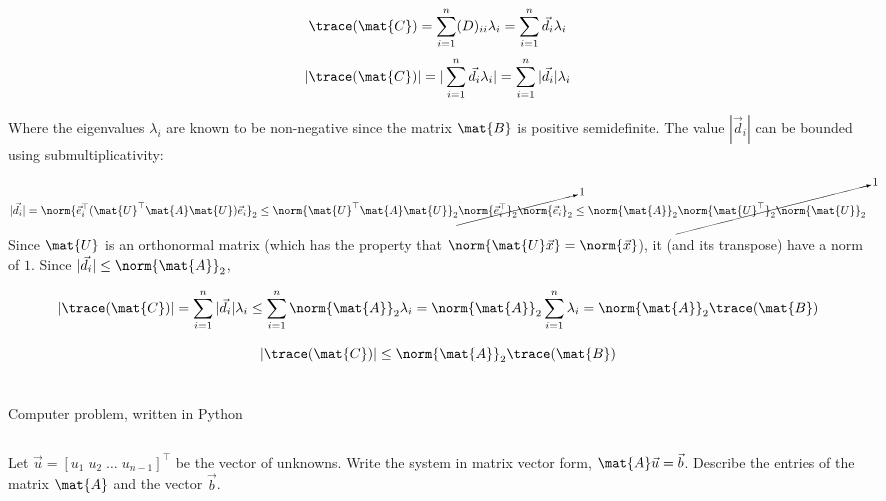 \documentclass{template}
\begin{document}
\begin{equation}
    \trace(\mat{C}) = \sum_{i=1}^n (D)_{ii}\lambda_i = \sum_{i=1}^n \vec{d}_{i}\lambda_i
\end{equation}
\begin{equation}
    |\trace(\mat{C})| = |\sum_{i=1}^n \vec{d}_{i}\lambda_i| = \sum_{i=1}^n |\vec{d}_{i}|\lambda_i
\end{equation}

Where the eigenvalues $\lambda_i$ are known to be non-negative since the matrix $\mat{B}$ is positive semidefinite. The value $|\vec{d}_i|$ can be bounded using submultiplicativity:

\begin{equation}
    |\vec{d}_i| = \norm{\vec{e}_i^\top(\mat{U}^\top\mat{A}\mat{U})\vec{e}_i}_2 \leq \norm{\mat{U}^\top\mat{A}\mat{U}}_2\cancelto{1}{\norm{\vec{e}_i^\top}_2\norm{\vec{e}_i}_2} \leq \norm{\mat{A}}_2\cancelto{1}{\norm{\mat{U}^\top}_2\norm{\mat{U}}_2}
\end{equation}

Since $\mat{U}$ is an orthonormal matrix (which has the property that $\norm{\mat{U}\vec{x}} = \norm{\vec{x}}$), it (and its transpose) have a norm of $1$. Since $|\vec{d}_i| \leq \norm{\mat{A}}_2$,

\begin{equation}
    |\trace(\mat{C})| = \sum_{i=1}^n |\vec{d}_{i}|\lambda_i \leq \sum_{i=1}^n \norm{\mat{A}}_2\lambda_i = \norm{\mat{A}}_2\sum_{i=1}^n \lambda_i = \norm{\mat{A}}_2\trace(\mat{B})
\end{equation}

\begin{equation}
    |\trace(\mat{C})|\leq \norm{\mat{A}}_2\trace(\mat{B})
\end{equation}


\newpage
\section{} 

Computer problem, written in Python

\subsection{}\label{sec:algorithm}

Let $\vec{u} = [u_1\; u_2\; \ldots\; u_{n-1}]^\top$ be the vector of unknowns. Write the system
in matrix vector form, $\mat{A}\vec{u} = \vec{b}$.
Describe the entries of the matrix $\mat{A}$ and the vector $\vec{b}$.
\end{document}

